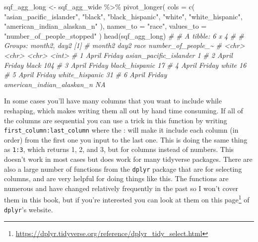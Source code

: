 \documentclass[
  a4paper,
]{krantz}
\makeatletter
\newenvironment{Shaded}{\begin{snugshade}}{\end{snugshade}}
\newcommand{\AttributeTok}[1]{\textcolor[rgb]{0.61,0.61,0.61}{#1}}
\newcommand{\CommentTok}[1]{\textcolor[rgb]{0.37,0.37,0.37}{\textit{#1}}}
\newcommand{\FunctionTok}[1]{\textcolor[rgb]{0,0,0}{#1}}
\newcommand{\NormalTok}[1]{#1}
\newcommand{\OtherTok}[1]{\textcolor[rgb]{0.37,0.37,0.37}{#1}}
\newcommand{\SpecialCharTok}[1]{\textcolor[rgb]{0,0,0}{#1}}
\newcommand{\StringTok}[1]{\textcolor[rgb]{0.5,0.5,0.5}{#1}}
\renewcommand{\href}[2]{#2\footnote{\url{#1}}}
\newenvironment{kframe}{%
\medskip{}
\setlength{\fboxsep}{.8em}
 \def\at@end@of@kframe{}%
 \ifinner\ifhmode%
  \def\at@end@of@kframe{\end{minipage}}%
  \begin{minipage}{\columnwidth}%
 \fi\fi%
 \def\FrameCommand##1{\hskip\@totalleftmargin \hskip-\fboxsep
 \colorbox{shadecolor}{##1}\hskip-\fboxsep
     \hskip-\linewidth \hskip-\@totalleftmargin \hskip\columnwidth}%
 \MakeFramed {\advance\hsize-\width
   \@totalleftmargin\z@ \linewidth\hsize
   \@setminipage}}%
 {\par\unskip\endMakeFramed%
 \at@end@of@kframe}
\renewenvironment{Shaded}{\begin{kframe}}{\end{kframe}}
\makeatother
\begin{document}
\begin{Shaded}
\begin{Highlighting}[]
\NormalTok{sqf\_agg\_long }\OtherTok{\textless{}{-}}\NormalTok{ sqf\_agg\_wide }\SpecialCharTok{\%\textgreater{}\%}
  \FunctionTok{pivot\_longer}\NormalTok{(}
    \AttributeTok{cols =} \FunctionTok{c}\NormalTok{(}
      \StringTok{"asian\_pacific\_islander"}\NormalTok{,}
      \StringTok{"black"}\NormalTok{,}
      \StringTok{"black\_hispanic"}\NormalTok{,}
      \StringTok{"white"}\NormalTok{,}
      \StringTok{"white\_hispanic"}\NormalTok{,}
      \StringTok{"american\_indian\_alaskan\_n"}
\NormalTok{    ),}
    \AttributeTok{names\_to =} \StringTok{"race"}\NormalTok{,}
    \AttributeTok{values\_to =} \StringTok{"number\_of\_people\_stopped"}
\NormalTok{  )}
\FunctionTok{head}\NormalTok{(sqf\_agg\_long)}
\CommentTok{\# \# A tibble: 6 x 4}
\CommentTok{\# \# Groups:   month2, day2 [1]}
\CommentTok{\#   month2 day2   race                      number\_of\_people\_\textasciitilde{}}
\CommentTok{\#   \textless{}chr\textgreater{}  \textless{}chr\textgreater{}  \textless{}chr\textgreater{}                                  \textless{}int\textgreater{}}
\CommentTok{\# 1 April  Friday asian\_pacific\_islander                     1}
\CommentTok{\# 2 April  Friday black                                    104}
\CommentTok{\# 3 April  Friday black\_hispanic                            17}
\CommentTok{\# 4 April  Friday white                                     16}
\CommentTok{\# 5 April  Friday white\_hispanic                            31}
\CommentTok{\# 6 April  Friday american\_indian\_alaskan\_n                 NA}
\end{Highlighting}
\end{Shaded}

In some cases you'll have many columns that you want to
include while reshaping, which makes writing them all out by
hand time consuming. If all of the columns are sequential
you can use a trick in this function by writing
\texttt{first\_column:last\_column} where the : will make it
include each column (in order) from the first one you input
to the last one. This is doing the same thing as
\texttt{1:3}, which returns 1, 2, and 3, but for columns
instead of numbers. This doesn't work in most cases but does
work for many tidyverse packages. There are also a large
number of functions from the \texttt{dplyr} package that are
for selecting columns, and are very helpful for doing things
like this. The functions are numerous and have changed
relatively frequently in the past so I won't cover them in
this book, but if you're interested you can look at them on
\href{https://dplyr.tidyverse.org/reference/dplyr_tidy_select.html}{this
page} of \texttt{dplyr}'s website.
\end{document}
